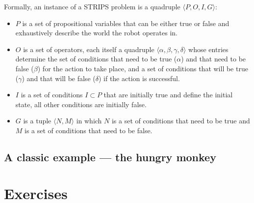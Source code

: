Formally, an instance of a STRIPS problem is a quadruple $\langle P, O, I, G \rangle$:
\begin{itemize}
\item $P$ is a set of propositional variables that can be either true or false and exhaustively describe the world the robot operates in. 
\item $O$ is a set of operators, each itself a quadruple $\langle \alpha, \beta, \gamma, \delta \rangle$ whose entries determine the set of conditions that need to be true ($\alpha$) and that need to be false ($\beta$) for the action to take place, and a set of conditions that will be true ($\gamma$) and that will be false ($\delta$) if the action is successful. 
\item $I$ is a set of conditions $I \subset P$ that are initially true and define the initial state, all other conditions are initially false. 
\item $G$ is a tuple $\langle N, M\rangle$ in which $N$ is a set of conditions that need to be true and $M$ is a set of conditions that need to be false. 
\end{itemize}

\subsection{A classic example --- the hungry monkey}




\section{Exercises}

